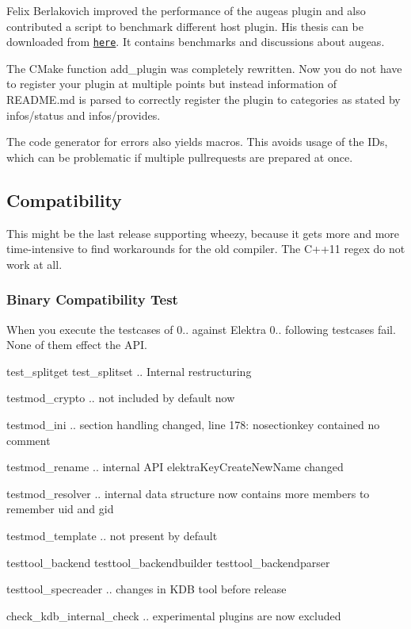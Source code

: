 Felix Berlakovich improved the performance of the augeas plugin and also contributed a script to benchmark different host plugin. His thesis can be downloaded from \href{http://www.libelektra.org/ftp/elektra/berlakovich2016universal.pdf}{\tt here}. It contains benchmarks and discussions about augeas.

The C\+Make function {\ttfamily add\+\_\+plugin} was completely rewritten. Now you do not have to register your plugin at multiple points but instead information of R\+E\+A\+D\+M\+E.\+md is parsed to correctly register the plugin to categories as stated by {\ttfamily infos/status} and {\ttfamily infos/provides}.

The code generator for errors also yields macros. This avoids usage of the I\+Ds, which can be problematic if multiple pullrequests are prepared at once.

\subsection*{Compatibility}

This might be the last release supporting wheezy, because it gets more and more time-\/intensive to find workarounds for the old compiler. The C++11 regex do not work at all.

\subsubsection*{Binary Compatibility Test}

When you execute the testcases of 0.. against Elektra 0.. following testcases fail. None of them effect the A\+P\+I.


\begin{DoxyItemize}
\item test\+\_\+splitget test\+\_\+splitset .. Internal restructuring
\item testmod\+\_\+crypto .. not included by default now
\item testmod\+\_\+ini .. section handling changed, line 178\+: {\ttfamily nosectionkey contained no comment}
\item testmod\+\_\+rename .. internal A\+P\+I elektra\+Key\+Create\+New\+Name changed
\item testmod\+\_\+resolver .. internal data structure now contains more members to remember uid and gid
\item testmod\+\_\+template .. not present by default
\item testtool\+\_\+backend testtool\+\_\+backendbuilder testtool\+\_\+backendparser
\item testtool\+\_\+specreader .. changes in K\+D\+B tool before release
\item check\+\_\+kdb\+\_\+internal\+\_\+check .. experimental plugins are now excluded
\end{DoxyItemize}

